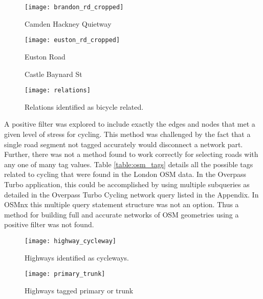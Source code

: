 \begin{figure}
\centering
\texttt{[image: brandon\_rd\_cropped]}
\caption{Camden Hackney Quietway}
\label{fig:brandon}
\end{figure}

\begin{figure}
\centering
\texttt{[image: euston\_rd\_cropped]}
\caption{Euston Road}
\label{fig:euston}
\end{figure}

\begin{figure}
  \centering
  \caption{Castle Baynard St}
  \label{fig:baynard}
\end{figure}

\begin{figure}
\centering
\texttt{[image: relations]}
\caption{Relations identified as bicycle related.}
\label{fig:bicycle_relation}
\end{figure}

A positive filter was explored to include exactly the edges and nodes that met a given level of stress for cycling. This method was challenged by the fact that a single road segment not tagged accurately would disconnect a network part. Further, there was not a method found to work correctly for selecting roads with any one of many tag values.  Table \ref{table:osm_tags} details all the possible tags related to cycling that were found in the London OSM data.  In the Overpass Turbo application, this could be accomplished by using multiple subqueries as detailed in the Overpass Turbo Cycling network query listed in the Appendix. In OSMnx this multiple query statement structure was not an option. Thus a method for building full and accurate networks of OSM geometries using a positive filter was not found. 

\begin{figure}
\centering
\texttt{[image: highway\_cycleway]}
\caption{Highways identified as cycleways.}
\label{fig:highway_cycleway}
\end{figure}


\begin{figure}
\centering
\texttt{[image: primary\_trunk]}
\caption{Highways tagged primary or trunk}
\label{fig:primary_trunk}
\end{figure}

